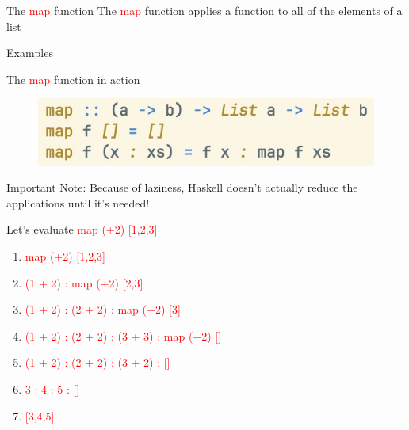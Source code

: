 \documentclass[pdf]{beamer}
\newcommand{\code}[1]{\textcolor{Red}{\textsf{#1}}}
\begin{document}
\begin{frame}{The \code{map} function}
  The \code{map} function applies a function to all of the elements of a list

  Examples
\begin{figure}[H]
    \centering
    \vspace{0.1cm}
    \vspace{0.1cm}
    \pause
  \end{figure}
\end{frame}

\begin{frame}{The \code{map} function in action}
  \begin{figure}[H]
    \centering
    \includegraphics[width=\textwidth]{map-hs}
  \end{figure}
  Important Note: Because of laziness, Haskell doesn't actually reduce the applications until it's needed!

  Let's evaluate \code{map (+2) [1,2,3]}
  \begin{enumerate}
  \item \code{map (+2) [1,2,3]}
  \item \code{(1 + 2) : map (+2) [2,3]}
  \item \code{(1 + 2) : (2 + 2) : map (+2) [3]}
  \item \code{(1 + 2) : (2 + 2) : (3 + 3) : map (+2) []}
  \item \code{(1 + 2) : (2 + 2) : (3 + 2) : []}
  \item \code{3 : 4 : 5 : []}
  \item \code{[3,4,5]}
  \end{enumerate}
\end{frame}
\end{document}
